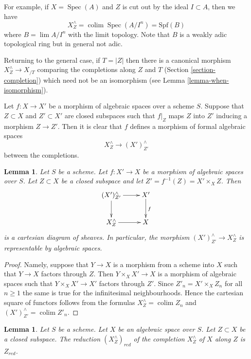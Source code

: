 \documentclass{stacks-project}
\theoremstyle{plain}
\newtheorem{lemma}[subsection]{Lemma}
\theoremstyle{definition}
\theoremstyle{remark}
\numberwithin{equation}{subsection}
\def\lim{\mathop{\mathrm{lim}}\nolimits}
\def\colim{\mathop{\mathrm{colim}}\nolimits}
\def\Spec{\mathop{\mathrm{Spec}}}
\begin{document}
\noindent
For example, if $X = \Spec(A)$ and $Z$ is cut out by the ideal $I \subset A$,
then we have
$$
X^\wedge_Z = \colim \Spec(A/I^n) = \text{Spf}(B)
$$
where $B = \lim A/I^n$ with the limit topology. Note that $B$ is a
weakly adic topological ring but in general not adic.

\medskip\noindent
Returning to the general case, if $T = |Z|$ then there is a canonical morphism
$X^\wedge_Z \to X_{/T}$ comparing the completions along $Z$
and $T$ (Section \ref{section-completion}) which need not be an isomorphism
(see Lemma \ref{lemma-when-isomorphism}).

\medskip\noindent
Let $f : X \to X'$ be a morphism of algebraic spaces over a scheme $S$.
Suppose that $Z \subset X$ and $Z' \subset X'$ are closed subspaces
such that $f|_Z$ maps $Z$ into $Z'$ inducing a morphism $Z \to Z'$.
Then it is clear that $f$ defines a morphism of formal algebraic spaces
$$
X^\wedge_Z \longrightarrow (X')^\wedge_{Z'}
$$
between the completions.

\begin{lemma}
\label{lemma-map-completions-subspaces-representable}
Let $S$ be a scheme. Let $f : X' \to X$ be a morphism
of algebraic spaces over $S$. Let $Z \subset X$
be a closed subspace and let $Z' = f^{-1}(Z) = X' \times_X Z$.
Then
$$
\xymatrix{
(X')^\wedge_{Z'} \ar[r] \ar[d] & X' \ar[d]^f \\
X^\wedge_Z \ar[r] & X
}
$$
is a cartesian diagram of sheaves. In particular, the morphism
$(X')^\wedge_{Z'} \to X^\wedge_Z$ is representable by algebraic spaces.
\end{lemma}

\begin{proof}
Namely, suppose that $Y \to X$ is a morphism from a scheme into $X$ such
that $Y \to X$ factors through $Z$. Then $Y \times_X X' \to X$
is a morphism of algebraic spaces such that $Y \times_X X' \to X'$
factors through $Z'$. Since $Z'_n = X' \times_X Z_n$ for all $n \geq 1$
the same is true for the infinitesimal neighbourhoods.
Hence the cartesian square of functors follows
from the formulas $X^\wedge_Z = \colim Z_n$ and
$(X')^\wedge_{Z'} = \colim Z'_n$.
\end{proof}

\begin{lemma}
\label{lemma-reduction-completion-subspace}
Let $S$ be a scheme. Let $X$ be an algebraic space over $S$.
Let $Z \subset X$ be a closed subspace. The reduction $(X^\wedge_Z)_{red}$
of the completion $X^\wedge_Z$ of $X$ along $Z$ is $Z_{red}$.
\end{lemma}
\end{document}
